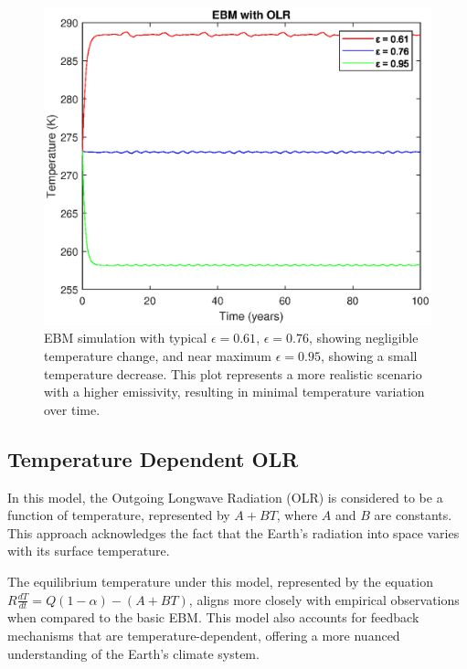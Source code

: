 \documentclass[12pt]{article}
\begin{document}
\begin{figure}[!hbt]
    \centering
    \includegraphics[width=\textwidth]{images/ebm_with_diff_olrs.eps}
    \caption{EBM simulation with typical $\epsilon=0.61$,
    $\epsilon=0.76$, 
    showing negligible temperature change,
    and near maximum $\epsilon=0.95$, 
    showing a small temperature decrease. 
    This plot represents a more realistic scenario 
    with a higher emissivity, 
    resulting in minimal temperature variation over time.}

    \label{fig:sub2}
\end{figure}


\subsection{Temperature Dependent OLR}
In this model, the Outgoing Longwave Radiation (OLR) 
is considered to be a function of temperature, 
represented by \( A + BT \), 
where \( A \) and \( B \) are constants. 
This approach acknowledges the fact that the Earth's radiation 
into space varies with its surface temperature. 

The equilibrium temperature under this model, 
represented by the equation 
\( R\frac{dT}{dt} = Q(1 - \alpha) - (A + BT) \), 
aligns more closely with empirical observations 
when compared to the basic EBM. 
This model also accounts for feedback mechanisms 
that are temperature-dependent, 
offering a more nuanced understanding of the Earth's climate system. 
\end{document}
